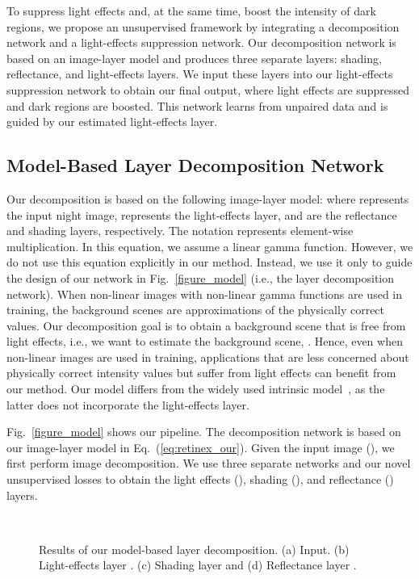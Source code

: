 \documentclass[runningheads]{llncs}
\begin{document}
To suppress light effects and, at the same time, boost the intensity of dark regions, we propose an unsupervised framework by integrating a decomposition network and a light-effects suppression network.
Our decomposition network is based on an image-layer model and produces three separate layers: shading, reflectance, and light-effects layers.
We input these layers into our light-effects suppression network to obtain our final output, where light effects are suppressed and dark regions are boosted. 
This network learns from unpaired data and is guided by our estimated light-effects layer.

\subsection{Model-Based Layer Decomposition Network}
Our decomposition is based on the following image-layer model:
where  represents the input night image,  represents the light-effects layer,  and  are the reflectance and shading layers, respectively. The notation  represents element-wise multiplication. 
In this equation, we assume a linear gamma function. However, we do not use this equation explicitly in our method. Instead, we use it only to guide the design of our network in Fig.~\ref{figure_model} (i.e., the layer decomposition network). When non-linear images with non-linear gamma functions are used in training, the background scenes are approximations of the physically correct values.
Our decomposition goal is to obtain a background scene that is free from light effects, i.e., we want to estimate the background scene, .
Hence, even when non-linear images are used in training, applications that are less concerned about physically correct intensity values but suffer from light effects can benefit from our method. 
Our model differs from the widely used intrinsic model~\cite{gehler11nips,bell2014intrinsic}, as the latter does not incorporate the light-effects layer.

Fig.~\ref{figure_model} shows our pipeline. The decomposition network is based on our image-layer model in Eq.~(\ref{eq:retinex_our}). 
Given the input image (), we first perform image decomposition. We use three separate networks and our novel unsupervised losses to obtain the light effects (), shading (), and reflectance () layers.

\begin{figure}[t]
	\centering
\captionsetup[subfloat]{farskip=1pt}
	\setcounter{subfigure}{0}
	\hfill
	\hfill
	\hfill
	\hfill\\
	\caption{Results of our model-based layer decomposition. (a) Input. (b) Light-effects layer . (c) Shading layer  and (d) Reflectance layer .}
	\label{figure_decomposition}
\end{figure}
\end{document}
